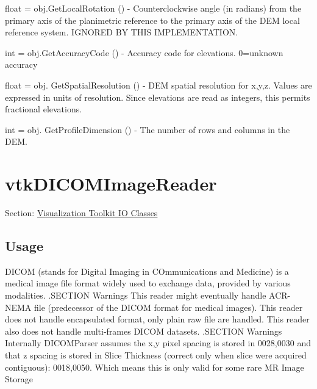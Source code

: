 \begin{DoxyItemize}
\item {\ttfamily float = obj.\-Get\-Local\-Rotation ()} -\/ Counterclockwise angle (in radians) from the primary axis of the planimetric reference to the primary axis of the D\-E\-M local reference system. I\-G\-N\-O\-R\-E\-D B\-Y T\-H\-I\-S I\-M\-P\-L\-E\-M\-E\-N\-T\-A\-T\-I\-O\-N.  
\item {\ttfamily int = obj.\-Get\-Accuracy\-Code ()} -\/ Accuracy code for elevations. 0=unknown accuracy  
\item {\ttfamily float = obj. Get\-Spatial\-Resolution ()} -\/ D\-E\-M spatial resolution for x,y,z. Values are expressed in units of resolution. Since elevations are read as integers, this permits fractional elevations.  
\item {\ttfamily int = obj. Get\-Profile\-Dimension ()} -\/ The number of rows and columns in the D\-E\-M.  
\end{DoxyItemize}\hypertarget{vtkio_vtkdicomimagereader}{}\section{vtk\-D\-I\-C\-O\-M\-Image\-Reader}\label{vtkio_vtkdicomimagereader}
Section\-: \hyperlink{sec_vtkio}{Visualization Toolkit I\-O Classes} \hypertarget{vtkwidgets_vtkxyplotwidget_Usage}{}\subsection{Usage}\label{vtkwidgets_vtkxyplotwidget_Usage}
D\-I\-C\-O\-M (stands for Digital Imaging in C\-Ommunications and Medicine) is a medical image file format widely used to exchange data, provided by various modalities. .S\-E\-C\-T\-I\-O\-N Warnings This reader might eventually handle A\-C\-R-\/\-N\-E\-M\-A file (predecessor of the D\-I\-C\-O\-M format for medical images). This reader does not handle encapsulated format, only plain raw file are handled. This reader also does not handle multi-\/frames D\-I\-C\-O\-M datasets. .S\-E\-C\-T\-I\-O\-N Warnings Internally D\-I\-C\-O\-M\-Parser assumes the x,y pixel spacing is stored in 0028,0030 and that z spacing is stored in Slice Thickness (correct only when slice were acquired contiguous)\-: 0018,0050. Which means this is only valid for some rare M\-R Image Storage

